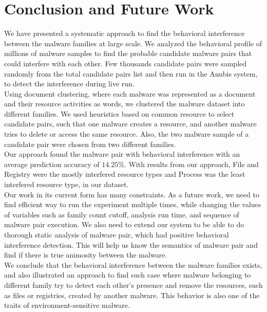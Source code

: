 \chapter{Conclusion and Future Work}\label{chapter:conclusion_and_future_work}
We have presented a systematic approach to find the behavioral interference between the malware families at large scale.
We analyzed the behavioral profile of millions of malware samples to find the probable candidate malware pairs that could interfere with each other.
Few thousands candidate pairs were sampled randomly from the total candidate pairs list and then run in the Anubis system, to detect the interference during live run.\\

Using document clustering, where each malware was represented as a document and their resource activities as words, we clustered the malware dataset into different families.
We used heuristics based on common resource to select candidate pairs, such that one malware creates a resource, and another malware tries to delete or access the same resource.
Also, the two malware sample of a candidate pair were chosen from two different families.\\

Our approach found the malware pair with behavioral interference with an average prediction accuracy of $14.25\%$.
With results from our approach, File and Registry were the mostly interfered resource types and Process was the least interfered resource type, in our dataset.\\

Our work in its current form has many constraints.
As a future work, we need to find efficient way to run the experiment multiple times, while changing the values of variables such as family count cutoff, analysis run time, and sequence of malware pair execution.
We also need to extend our system to be able to do thorough static analysis of malware pair, which had positive behavioral interference detection.
This will help us know the semantics of malware pair and find if there is true animosity between the malware.
\\

We conclude that the behavioral interference between the malware families exists, and also illustrated an approach to find such case where malware belonging to different family try to detect each other's presence and remove the resources, such as files or registries, created by another malware.
This behavior is also one of the traits of environment-sensitive malware.
